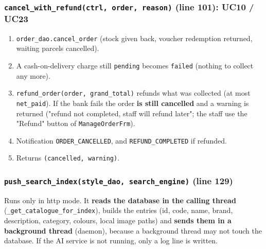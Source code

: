 \hypertarget{cancel_with_refundctrl-order-reason-line-101-uc10-uc23}{%
\subsubsection{\texorpdfstring{\texttt{cancel\_\allowbreak{}with\_\allowbreak{}refund(\allowbreak{}ctrl,\allowbreak{} order,\allowbreak{} reason)}
(line 101): UC10 /
UC23}{cancel\_with\_refund(ctrl, order, reason) (line 101): UC10 / UC23}}\label{cancel_with_refundctrl-order-reason-line-101-uc10-uc23}}

\begin{enumerate}
\def\labelenumi{\arabic{enumi}.}
\tightlist
\item
  \texttt{order\_\allowbreak{}dao.\allowbreak{}cancel\_\allowbreak{}order} (stock given back, voucher
  redemption returned, waiting parcels cancelled).
\item
  A cash-on-delivery charge still \texttt{pending} becomes
  \texttt{failed} (nothing to collect any more).
\item
  \texttt{refund\_\allowbreak{}order(\allowbreak{}order,\allowbreak{} grand\_\allowbreak{}total)} refunds what was
  collected (at most \texttt{net\_\allowbreak{}paid}). If the bank fails the order
  \textbf{is still cancelled} and a warning is returned ("refund not
  completed, staff will refund later"; the staff use the "Refund" button
  of \texttt{ManageOrderFrm}).
\item
  Notification \texttt{ORDER\_\allowbreak{}CANCELLED}, and \texttt{REFUND\_\allowbreak{}COMPLETED}
  if refunded.
\item
  Returns \texttt{(\allowbreak{}cancelled,\allowbreak{} warning)}.
\end{enumerate}

\hypertarget{push_search_indexstyle_dao-search_engine-line-129}{%
\subsubsection{\texorpdfstring{\texttt{push\_\allowbreak{}search\_\allowbreak{}index(\allowbreak{}style\_\allowbreak{}dao,\allowbreak{} search\_\allowbreak{}engine)}
(line
129)}{push\_search\_index(style\_dao, search\_engine) (line 129)}}\label{push_search_indexstyle_dao-search_engine-line-129}}

Runs only in http mode. It \textbf{reads the database in the calling
thread} (\texttt{\_\allowbreak{}get\_\allowbreak{}catalogue\_\allowbreak{}for\_\allowbreak{}index}), builds the entries (id,
code, name, brand, description, category, colours, local image paths)
and \textbf{sends them in a background thread} (daemon), because a
background thread may not touch the database. If the AI service is not
running, only a log line is written.

